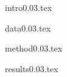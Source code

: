 \documentclass[useAMS,usenatbib]{mn2e}
\begin{document}
{intro0.03.tex}

{data0.03.tex}


{method0.03.tex}

{results0.03.tex}

\end{document}
